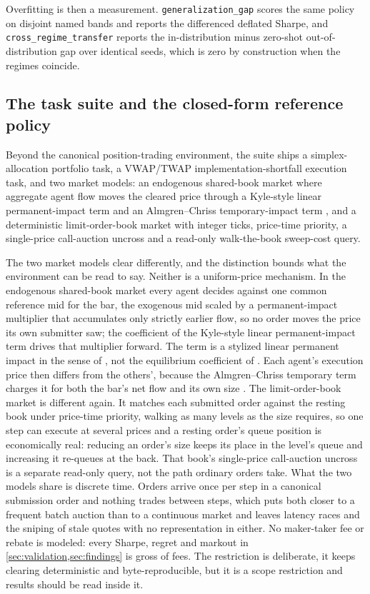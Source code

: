 Overfitting is then a measurement. \texttt{generalization\_gap} scores the same policy on disjoint named bands and reports the differenced deflated Sharpe, and \texttt{cross\_regime\_transfer} reports the in-distribution minus zero-shot out-of-distribution gap over identical seeds, which is zero by construction when the regimes coincide.

\subsection{The task suite and the closed-form reference policy}\label{sec:tasks}

Beyond the canonical position-trading environment, the suite ships a simplex-allocation portfolio task, a VWAP/TWAP implementation-shortfall execution task, and two market models: an endogenous shared-book market where aggregate agent flow moves the cleared price through a Kyle-style linear permanent-impact term \citep{kyle1985continuous} and an Almgren--Chriss temporary-impact term \citep{almgren2001optimal}, and a deterministic limit-order-book market with integer ticks, price-time priority, a single-price call-auction uncross and a read-only walk-the-book sweep-cost query.

The two market models clear differently, and the distinction bounds what the environment can be read to say. Neither is a uniform-price mechanism. In the endogenous shared-book market every agent decides against one common reference mid for the bar, the exogenous mid scaled by a permanent-impact multiplier that accumulates only strictly earlier flow, so no order moves the price its own submitter saw; the coefficient of the Kyle-style linear permanent-impact term drives that multiplier forward. The term is a stylized linear permanent impact in the sense of \citet{huberman2004price}, not the equilibrium coefficient of \citet{kyle1985continuous}. Each agent's execution price then differs from the others', because the Almgren--Chriss temporary term charges it for both the bar's net flow and its own size \citep{almgren2001optimal}. The limit-order-book market is different again. It matches each submitted order against the resting book under price-time priority, walking as many levels as the size requires, so one step can execute at several prices and a resting order's queue position is economically real: reducing an order's size keeps its place in the level's queue and increasing it re-queues at the back. That book's single-price call-auction uncross is a separate read-only query, not the path ordinary orders take. What the two models share is discrete time. Orders arrive once per step in a canonical submission order and nothing trades between steps, which puts both closer to a frequent batch auction \citep{budish2015high} than to a continuous market and leaves latency races and the sniping of stale quotes with no representation in either. No maker-taker fee or rebate is modeled: every Sharpe, regret and markout in \cref{sec:validation,sec:findings} is gross of fees. The restriction is deliberate, it keeps clearing deterministic and byte-reproducible, but it is a scope restriction and results should be read inside it.

